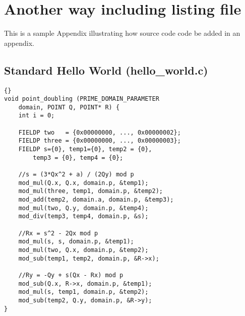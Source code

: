 \chapter{Another way including listing file}


This is a sample Appendix illustrating how source code code be added
in an appendix.

\section{Standard Hello World (hello\_world.c)}

\begin{figure*}[!ht]
 {\footnotesize
\begin{lstlisting}[frame=trbl]{}
void point_doubling (PRIME_DOMAIN_PARAMETER
    domain, POINT Q, POINT* R) {
    int i = 0;

    FIELDP two   = {0x00000000, ..., 0x00000002};
    FIELDP three = {0x00000000, ..., 0x00000003};
    FIELDP s={0}, temp1={0}, temp2 = {0},
        temp3 = {0}, temp4 = {0};

    //s = (3*Qx^2 + a) / (2Qy) mod p
    mod_mul(Q.x, Q.x, domain.p, &temp1);
    mod_mul(three, temp1, domain.p, &temp2);
    mod_add(temp2, domain.a, domain.p, &temp3);
    mod_mul(two, Q.y, domain.p, &temp4);
    mod_div(temp3, temp4, domain.p, &s);

    //Rx = s^2 - 2Qx mod p
    mod_mul(s, s, domain.p, &temp1);
    mod_mul(two, Q.x, domain.p, &temp2);
    mod_sub(temp1, temp2, domain.p, &R->x);

    //Ry = -Qy + s(Qx - Rx) mod p
    mod_sub(Q.x, R->x, domain.p, &temp1);
    mod_mul(s, temp1, domain.p, &temp2);
    mod_sub(temp2, Q.y, domain.p, &R->y);
}
\end{lstlisting}}
\end{figure*}

